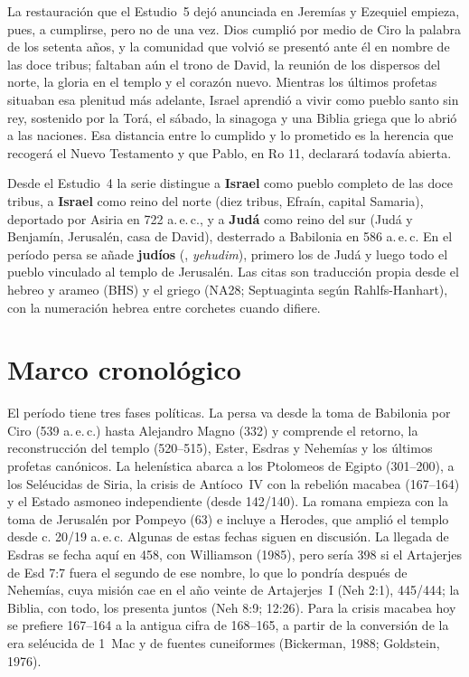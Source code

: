 La restauración que el Estudio~5 dejó anunciada en Jeremías y Ezequiel empieza, pues, a cumplirse, pero no de una vez. Dios cumplió por medio de Ciro la palabra de los setenta años, y la comunidad que volvió se presentó ante él en nombre de las doce tribus; faltaban aún el trono de David, la reunión de los dispersos del norte, la gloria en el templo y el corazón nuevo. Mientras los últimos profetas situaban esa plenitud más adelante, Israel aprendió a vivir como pueblo santo sin rey, sostenido por la Torá, el sábado, la sinagoga y una Biblia griega que lo abrió a las naciones. Esa distancia entre lo cumplido y lo prometido es la herencia que recogerá el Nuevo Testamento y que Pablo, en Ro 11, declarará todavía abierta.

\begin{nota}
Desde el Estudio~4 la serie distingue a \textbf{Israel} como pueblo completo de las doce tribus, a \textbf{Israel} como reino del norte (diez tribus, Efraín, capital Samaria), deportado por Asiria en 722 a.\,e.\,c., y a \textbf{Judá} como reino del sur (Judá y Benjamín, Jerusalén, casa de David), desterrado a Babilonia en 586 a.\,e.\,c. En el período persa se añade \textbf{judíos} (, \emph{yehudim}), primero los de Judá y luego todo el pueblo vinculado al templo de Jerusalén. Las citas son traducción propia desde el hebreo y arameo (BHS) y el griego (NA28; Septuaginta según Rahlfs-Hanhart), con la numeración hebrea entre corchetes cuando difiere.
\end{nota}

\section{Marco cronológico}

El período tiene tres fases políticas. La persa va desde la toma de Babilonia por Ciro (539 a.\,e.\,c.) hasta Alejandro Magno (332) y comprende el retorno, la reconstrucción del templo (520--515), Ester, Esdras y Nehemías y los últimos profetas canónicos. La helenística abarca a los Ptolomeos de Egipto (301--200), a los Seléucidas de Siria, la crisis de Antíoco~IV con la rebelión macabea (167--164) y el Estado asmoneo independiente (desde 142/140). La romana empieza con la toma de Jerusalén por Pompeyo (63) e incluye a Herodes, que amplió el templo desde c. 20/19 a.\,e.\,c. Algunas de estas fechas siguen en discusión. La llegada de Esdras se fecha aquí en 458, con Williamson (1985), pero sería 398 si el Artajerjes de Esd 7:7 fuera el segundo de ese nombre, lo que lo pondría después de Nehemías, cuya misión cae en el año veinte de Artajerjes~I (Neh 2:1), 445/444; la Biblia, con todo, los presenta juntos (Neh 8:9; 12:26). Para la crisis macabea hoy se prefiere 167--164 a la antigua cifra de 168--165, a partir de la conversión de la era seléucida de 1~Mac y de fuentes cuneiformes (Bickerman, 1988; Goldstein, 1976).

